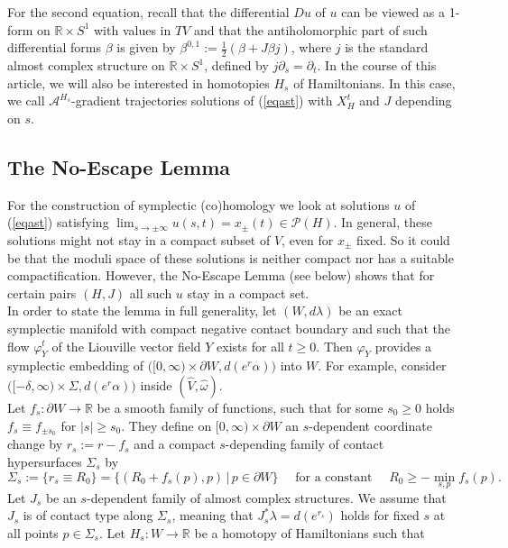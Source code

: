 \documentclass[a4paper,12pt,bibliography=totocnumbered,titlepage=false,abstracton,bookmarksnumbered=true]{scrartcl}
\theoremstyle{definition}
\begin{document}
For the second equation, recall that the differential $Du$ of $u$ can be viewed as a 1-form on $\mathbb{R}\times S^1$ with values in $TV$ and that the antiholomorphic part of such differential forms $\beta$ is given by $\beta^{0,1}:=\frac{1}{2}(\beta+J\beta j)$, where $j$ is the standard almost complex structure on $\mathbb{R}\times S^1$, defined by $j\partial_s=\partial_t$. In the course of this article, we will also be interested in homotopies $H_s$ of Hamiltonians. In this case, we call $\mathcal{A}^{H_s}$-gradient trajectories solutions of (\ref{eqast}) with $X_H^t$ and $J$ depending on $s$.
\subsection{The No-Escape Lemma}\label{secNoEsc}
For the construction of symplectic (co)homology we look at solutions $u$ of (\ref{eqast}) satisfying $\displaystyle\lim_{s\rightarrow\pm\infty}u(s,t)=x_{\pm}(t)\in\mathcal{P}(H)$. In general, these solutions might not stay in a compact subset of $\widehat{V}$, even for $x_\pm$ fixed. So it could be that the moduli space of these solutions is neither compact nor has a suitable compactification. However, the No-Escape Lemma (see below) shows that for certain pairs $(H,J)$ all such $u$ stay in a compact set.\\
In order to state the lemma in full generality, let $(W,d\lambda)$ be an exact symplectic manifold with compact negative contact boundary and such that the flow $\varphi_Y^t$ of the Liouville vector field $Y$ exists for all $t\geq 0$. Then $\varphi_Y$ provides a symplectic embedding of $\big([0,\infty){\times}\partial W, d(e^r\alpha)\big)$ into $W$. For example, consider $\big([-\delta,\infty){\times}\Sigma, d(e^r\alpha)\big)$ inside $(\widehat{V},\widehat{\omega})$.\\
Let $f_s:\partial W\rightarrow\mathbb{R}$ be a smooth family of functions, such that for some $s_0\geq 0$ holds $f_s\equiv f_{\pm s_0}$ for $|s|\geq s_0$. They define on $[0,\infty)\times\partial W$ an $s$-dependent coordinate change by $r_s:=r-f_s$ and a compact $s$-depending family of contact hypersurfaces $\Sigma_s$ by 
\[\Sigma_s:=\{r_s\equiv R_0\}=\big\{(R_0+f_s(p),p)\,\big|\,p\in\partial W\big\} \quad \text{ for a constant }\quad R_0\geq - \min_{s,p} f_s(p).\]
Let $J_s$ be an $s$-dependent family of almost complex structures. We assume that $J_s$ is of contact type along $\Sigma_s$, meaning that $J_s^\ast\lambda = d(e^{r_s})$ holds for fixed $s$ at all points $p\in\Sigma_s$. Let $H_s: W\rightarrow \mathbb{R}$ be a homotopy of Hamiltonians such that
\end{document}
